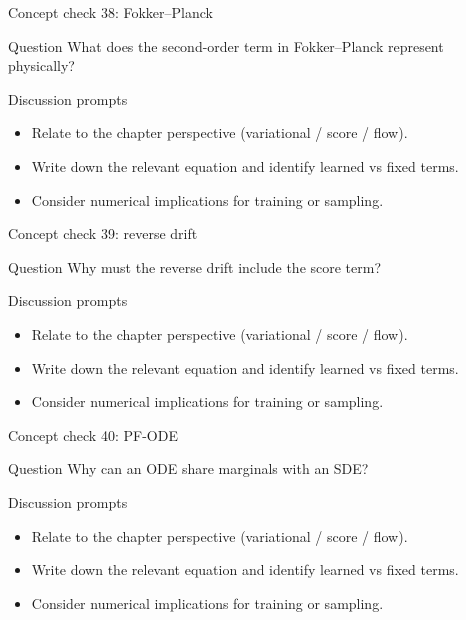 \documentclass[aspectratio=169]{beamer}
\begin{document}
\begin{frame}{Concept check 38: Fokker--Planck}
\begin{block}{Question}
What does the second-order term in Fokker--Planck represent physically?
\end{block}
\begin{block}{Discussion prompts}
\begin{itemize}
\item Relate to the chapter perspective (variational / score / flow).
\item Write down the relevant equation and identify learned vs fixed terms.
\item Consider numerical implications for training or sampling.
\end{itemize}
\end{block}
\end{frame}

\begin{frame}{Concept check 39: reverse drift}
\begin{block}{Question}
Why must the reverse drift include the score term?
\end{block}
\begin{block}{Discussion prompts}
\begin{itemize}
\item Relate to the chapter perspective (variational / score / flow).
\item Write down the relevant equation and identify learned vs fixed terms.
\item Consider numerical implications for training or sampling.
\end{itemize}
\end{block}
\end{frame}

\begin{frame}{Concept check 40: PF-ODE}
\begin{block}{Question}
Why can an ODE share marginals with an SDE?
\end{block}
\begin{block}{Discussion prompts}
\begin{itemize}
\item Relate to the chapter perspective (variational / score / flow).
\item Write down the relevant equation and identify learned vs fixed terms.
\item Consider numerical implications for training or sampling.
\end{itemize}
\end{block}
\end{frame}
\end{document}
